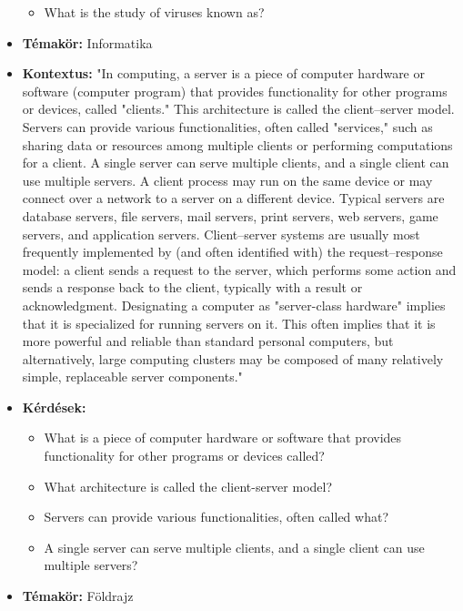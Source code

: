 \begin{itemize}
\begin{itemize}
		\item What is the study of viruses known as?
	\end{itemize}
\item \textbf{Témakör:} Informatika
\item \textbf{Kontextus:} "In computing, a server is a piece of computer hardware or software (computer program) that provides functionality for other programs or devices, called "clients." This architecture is called the client–server model. Servers can provide various functionalities, often called "services," such as sharing data or resources among multiple clients or performing computations for a client. A single server can serve multiple clients, and a single client can use multiple servers. A client process may run on the same device or may connect over a network to a server on a different device. Typical servers are database servers, file servers, mail servers, print servers, web servers, game servers, and application servers. Client–server systems are usually most frequently implemented by (and often identified with) the request–response model: a client sends a request to the server, which performs some action and sends a response back to the client, typically with a result or acknowledgment. Designating a computer as "server-class hardware" implies that it is specialized for running servers on it. This often implies that it is more powerful and reliable than standard personal computers, but alternatively, large computing clusters may be composed of many relatively simple, replaceable server components."
\item \textbf{Kérdések:} 
	\begin{itemize}
		\item What is a piece of computer hardware or software that provides functionality for other programs or devices called?
		\item What architecture is called the client-server model?
		\item Servers can provide various functionalities, often called what?
		\item A single server can serve multiple clients, and a single client can use multiple servers?
	\end{itemize}
\item \textbf{Témakör:} Földrajz

\end{itemize}
